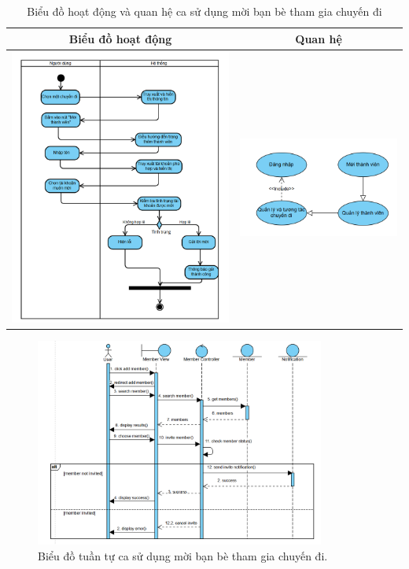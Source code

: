 \begin{table}[H] %
    \centering
    \caption{Biểu đồ hoạt động và quan hệ ca sử dụng mời bạn bè tham gia chuyến đi} %
    \label{tab:uc_invite_friend_diagrams} %
    \begin{tabular}{| c | c |}
        \hline
        \textbf{Biểu đồ hoạt động} & \textbf{Quan hệ} \\
        \hline
        \includegraphics[width=0.5\linewidth]{figures/c3/3-3-14-ad.png} %
        &
        \includegraphics[width=0.45\linewidth]{figures/c3/3-3-14-rd.png} \\ %
        \hline
    \end{tabular}
\end{table}

\begin{figure}[H]
    \centering
    \includegraphics[width=0.85\textwidth]{figures/c3/3-3-14-sd.png} %
    \caption{Biểu đồ tuần tự ca sử dụng mời bạn bè tham gia chuyến đi.} %
    \label{fig:3-3-14-sequence-diagram}
\end{figure}